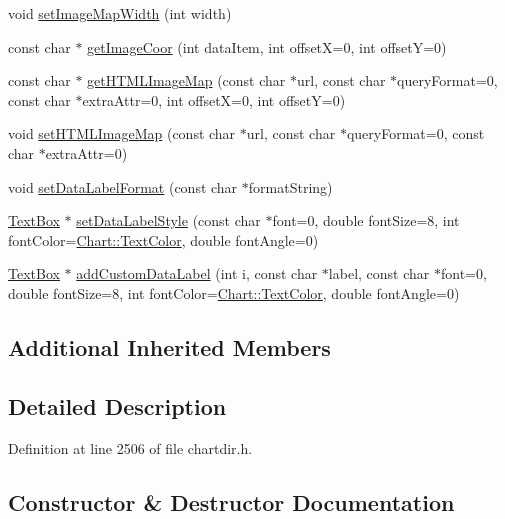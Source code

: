 \begin{DoxyCompactItemize}
void \hyperlink{class_polar_layer_a4a43a7e514a5ef17aae900b41a61c1af}{set\+Image\+Map\+Width} (int width)
\item 
const char $\ast$ \hyperlink{class_polar_layer_a06d7ebff644bdcbae6381e8d37d5a5bf}{get\+Image\+Coor} (int data\+Item, int offsetX=0, int offsetY=0)
\item 
const char $\ast$ \hyperlink{class_polar_layer_aa9ce8e1ae886b67e135b1723ba00b745}{get\+H\+T\+M\+L\+Image\+Map} (const char $\ast$url, const char $\ast$query\+Format=0, const char $\ast$extra\+Attr=0, int offsetX=0, int offsetY=0)
\item 
void \hyperlink{class_polar_layer_a8866698da24c34140d649dcb76e83164}{set\+H\+T\+M\+L\+Image\+Map} (const char $\ast$url, const char $\ast$query\+Format=0, const char $\ast$extra\+Attr=0)
\item 
void \hyperlink{class_polar_layer_a49d26c013a3f7ed01329306a2c8ff075}{set\+Data\+Label\+Format} (const char $\ast$format\+String)
\item 
\hyperlink{class_text_box}{Text\+Box} $\ast$ \hyperlink{class_polar_layer_ac9e8ab5fbec672ba966af4b6b7eda14c}{set\+Data\+Label\+Style} (const char $\ast$font=0, double font\+Size=8, int font\+Color=\hyperlink{namespace_chart_abee0d882fdc9ad0b001245ad9fc64011a879e14f2f5024caccc047374342321ef}{Chart\+::\+Text\+Color}, double font\+Angle=0)
\item 
\hyperlink{class_text_box}{Text\+Box} $\ast$ \hyperlink{class_polar_layer_afacdf935ec0cd4a6c99bee27491c1078}{add\+Custom\+Data\+Label} (int i, const char $\ast$label, const char $\ast$font=0, double font\+Size=8, int font\+Color=\hyperlink{namespace_chart_abee0d882fdc9ad0b001245ad9fc64011a879e14f2f5024caccc047374342321ef}{Chart\+::\+Text\+Color}, double font\+Angle=0)
\end{DoxyCompactItemize}
\subsection*{Additional Inherited Members}


\subsection{Detailed Description}


Definition at line 2506 of file chartdir.\+h.



\subsection{Constructor \& Destructor Documentation}
\mbox{\label{class_polar_layer_a38e4c8a6a9b14259423d9b338b843b9a}} 
